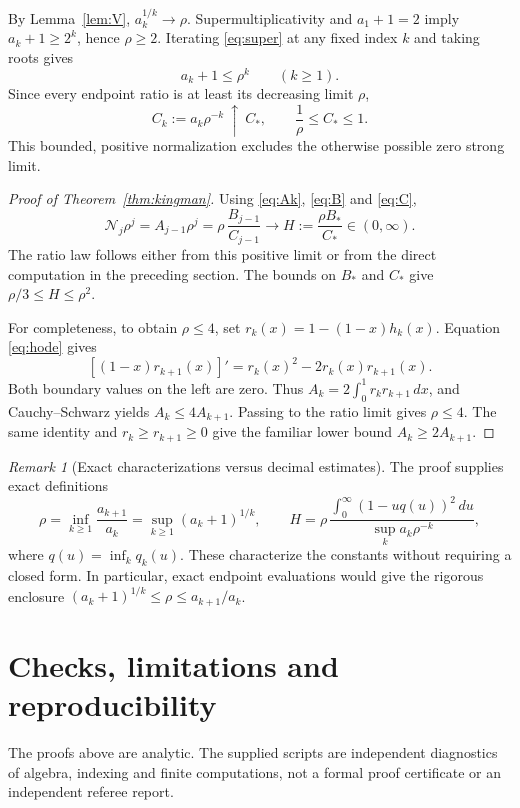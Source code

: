 \documentclass[11pt,a4paper]{article}
\theoremstyle{remark}\newtheorem{remark}[theorem]{Remark}
\newcommand{\NN}{\mathcal N}
\begin{document}
By Lemma~\ref{lem:V}, $a_k^{1/k}\to\rho$. Supermultiplicativity and $a_1+1=2$ imply $a_k+1\ge2^k$, hence $\rho\ge2$. Iterating \eqref{eq:super} at any fixed index $k$ and taking roots gives
\begin{equation}\label{eq:endpointbound}
a_k+1\le\rho^k\qquad(k\ge1).
\end{equation}
Since every endpoint ratio is at least its decreasing limit $\rho$,
\begin{equation}\label{eq:C}
C_k:=a_k\rho^{-k}\ \uparrow\ C_*,\qquad
\frac1\rho\le C_*\le1.
\end{equation}
This bounded, positive normalization excludes the otherwise possible zero strong limit.

\begin{proof}[Proof of Theorem~\ref{thm:kingman}]
Using \eqref{eq:Ak}, \eqref{eq:B} and \eqref{eq:C},
\[
\NN_j\rho^j=A_{j-1}\rho^j
=\rho\,\frac{B_{j-1}}{C_{j-1}}
\longrightarrow H:=\frac{\rho B_*}{C_*}\in(0,\infty).
\]
The ratio law follows either from this positive limit or from the direct computation in the preceding section. The bounds on $B_*$ and $C_*$ give $\rho/3\le H\le\rho^2$.

For completeness, to obtain $\rho\le4$, set $r_k(x)=1-(1-x)h_k(x)$. Equation \eqref{eq:hode} gives
\[
[(1-x)r_{k+1}(x)]'=r_k(x)^2-2r_k(x)r_{k+1}(x).
\]
Both boundary values on the left are zero. Thus
$A_k=2\int_0^1r_kr_{k+1}\,dx$, and Cauchy--Schwarz yields $A_k\le4A_{k+1}$. Passing to the ratio limit gives $\rho\le4$. The same identity and $r_k\ge r_{k+1}\ge0$ give the familiar lower bound $A_k\ge2A_{k+1}$.
\end{proof}

\begin{remark}[Exact characterizations versus decimal estimates]
The proof supplies exact definitions
\[
\rho=\inf_{k\ge1}\frac{a_{k+1}}{a_k}
=\sup_{k\ge1}(a_k+1)^{1/k},\qquad
H=\rho\,\frac{\int_0^\infty(1-uq(u))^2\,du}{\sup_k a_k\rho^{-k}},
\]
where $q(u)=\inf_kq_k(u)$. These characterize the constants without requiring a closed form. In particular, exact endpoint evaluations would give the rigorous enclosure
$(a_k+1)^{1/k}\le\rho\le a_{k+1}/a_k$.
\end{remark}

\section{Checks, limitations and reproducibility}
The proofs above are analytic. The supplied scripts are independent diagnostics of algebra, indexing and finite computations, not a formal proof certificate or an independent referee report.
\end{document}
